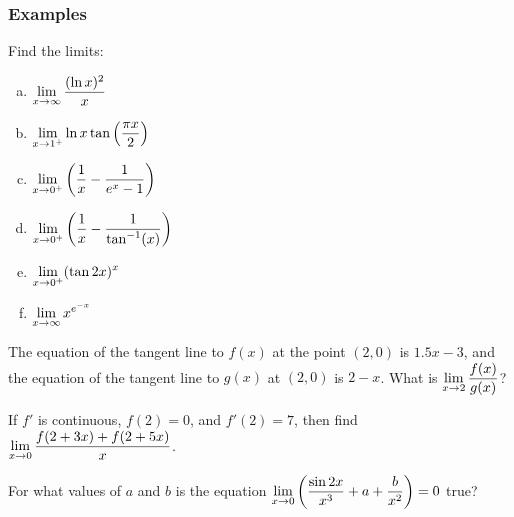 \documentclass[notes]{subfiles}
\begin{document}
	\subsubsection*{Examples}	
		\begin{ex}
			Find the limits:
			\begin{enumerate}[(a)]
				\item $\displaystyle \lim_{x\to \infty} \dfrac{(\ln x)^2}{x}$
					
				\item $\displaystyle \lim_{x\to 1^+} \ln x\tan\left( \dfrac{\pi x}{2}\right)$

				\item $\displaystyle \lim_{x\to 0^+} \left( \dfrac{1}{x} - \dfrac{1}{e^x-1}\right)$
					\newpage
					
				\item $\displaystyle \lim_{x\to 0^+} \left( \dfrac{1}{x} -\dfrac{1}{\tan^{-1}(x)}\right)$
					
				\item $\displaystyle \lim_{x\to 0^+} (\tan 2x)^x$
					
				\item $\displaystyle \lim_{x\to \infty} x^{e^{-x}}$
			\end{enumerate}
		\end{ex}	
			\newpage
			
		\begin{ex}
			The equation of the tangent line to $f(x)$ at the point $(2,0)$ is $1.5x-3$, and the equation of the tangent line to $g(x)$ at $(2,0)$ is $2-x$.  What is $\displaystyle \lim_{x\to 2} \dfrac{f(x)}{g(x)}$?  
		\end{ex}
			\vs{1}
			
		\begin{ex}
			If $f'$ is continuous, $f(2) = 0$, and $f'(2) = 7$, then find $\displaystyle \lim_{x\to 0} \dfrac{f(2+3x) + f(2+5x)}{x}$.
		\end{ex}
			\vs{1}
			
		\begin{ex}
			For what values of $a$ and $b$ is the equation $\displaystyle \lim_{x\to 0} \left( \dfrac{\sin 2x}{x^3} + a + \dfrac{b}{x^2}\right) = 0$ true?
		\end{ex}
			\vs{1}
			\newpage
			
\end{document}
